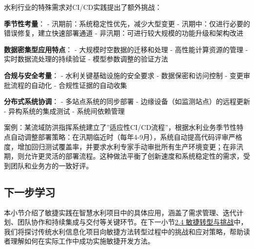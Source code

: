 水利行业的特殊需求对CI/CD实践提出了额外挑战：

\textbf{季节性考量}： - 汛期前：系统稳定性优先，减少大型变更 -
汛期中：仅进行必要的错误修复，建立快速部署通道 -
非汛期：可进行较大规模的功能升级和架构改进

\textbf{数据密集型应用特点}： - 大规模时空数据的迁移和处理 -
高性能计算资源的管理 - 实时数据流处理的持续验证 - 模型参数调整的验证方法

\textbf{合规与安全考量}： - 水利关键基础设施的安全要求 -
数据保密和访问控制 - 变更审批流程的自动化 - 合规性证据的自动收集

\textbf{分布式系统协调}： - 多站点系统的同步部署 -
边缘设备（如监测站点）的远程更新 - 异构系统的集成测试 - 系统间依赖管理

案例：某流域防洪指挥系统建立了''适应性CI/CD流程''，根据水利业务季节性特点自动调整部署策略：在汛期临近时（每年4-9月），系统自动提高代码评审严格度，增加回归测试覆盖率，并要求水利专家手动审批所有生产环境变更；在非汛期，则允许更灵活的部署流程。这种做法平衡了创新速度和系统稳定性的需求，受到团队和业务方的一致好评。

\subsection{下一步学习}\label{ux4e0bux4e00ux6b65ux5b66ux4e60}

本小节介绍了敏捷实践在智慧水利项目中的具体应用，涵盖了需求管理、迭代计划、团队协作和持续集成与交付等关键环节。在下一小节\href{section03-02-04.md}{2.4
敏捷转型与挑战}中，我们将探讨传统水利信息化项目向敏捷方法转型过程中的挑战和应对策略，帮助读者理解如何在实际工作中成功实施敏捷开发方法。
